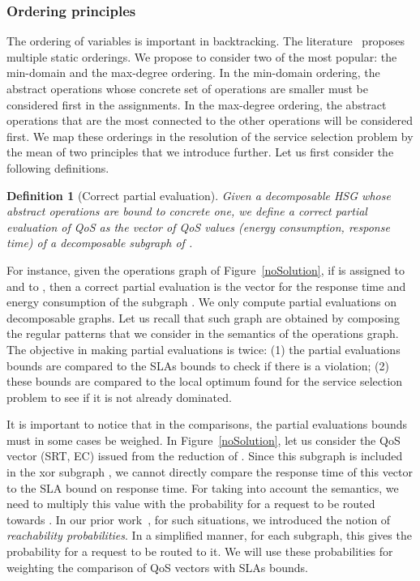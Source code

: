 \documentclass[a4paper]{article}
\newtheorem{definition}{Definition}
\begin{document}
\subsubsection{Ordering principles}

The ordering of variables is important in backtracking. The literature~\cite{Baker95intelligentbacktracking} proposes 
multiple static orderings. We propose to consider two of the most popular: the min-domain and the 
max-degree ordering. In the  min-domain ordering, the abstract operations whose concrete set of 
operations are smaller must be considered first in the assignments. In the max-degree ordering, the abstract operations 
that are the most connected to the other operations will be considered first. We map these orderings in the 
resolution of the service selection 
problem by the mean of two principles that we introduce further. Let us first consider the following definitions.  

\begin{definition}[Correct partial evaluation]
Given a decomposable HSG  whose abstract operations are bound to concrete one, we define a correct partial evaluation 
of QoS as the vector of QoS values (energy consumption, response time) of a decomposable subgraph of .  
\end{definition}

For instance, given the operations graph of Figure~\ref{noSolution}, if  is assigned to  and  to , then a 
correct partial evaluation is the vector  for the response time and energy consumption of 
the subgraph . We only compute partial evaluations on decomposable graphs. Let us recall that 
such graph are obtained by composing the regular patterns that we consider in the semantics of the operations 
graph. The objective in making partial evaluations is twice: (1) the partial evaluations bounds are compared 
to  the SLAs bounds to check if there is a violation; (2) these bounds are compared to the local optimum found for 
the service selection problem to see if it is not already dominated. 

It is important to notice that in the comparisons, the partial evaluations bounds must in some cases be weighed. 
In  Figure~\ref{noSolution}, let us consider the QoS vector (SRT, EC) issued from the reduction of . 
Since this subgraph is included in the xor subgraph , we cannot directly compare the response time 
of this vector to the SLA bound on response time. For taking into account the semantics, we need to multiply this value 
with the probability for a request to be routed towards . In our prior work~\cite{mgc2012}, for such situations, 
we introduced the notion of {\it reachability probabilities}. In a simplified manner, for each subgraph, this gives 
the probability for a request to be routed to it. We will use these probabilities for weighting the comparison of QoS 
vectors with SLAs bounds.
\end{document}
